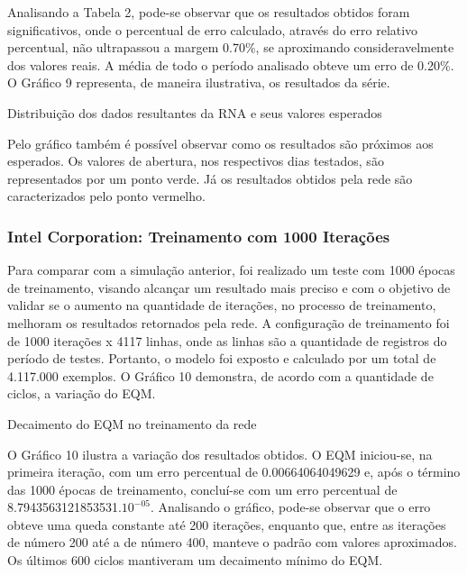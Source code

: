 Analisando a Tabela 2, pode-se observar que os resultados obtidos foram significativos, onde o percentual de erro calculado, através do erro relativo percentual, não ultrapassou a margem 0.70\%, se aproximando consideravelmente dos valores reais. A média de todo o período analisado obteve um erro de 0.20\%. O Gráfico 9 representa, de maneira ilustrativa, os resultados da série.
\begin{grafico}[h]
	\centering
	\caption{Distribuição dos dados resultantes da RNA e seus valores esperados}
	\label{lingua}
\end{grafico}

Pelo gráfico também é possível observar como os resultados são próximos aos esperados. Os valores de abertura, nos respectivos dias testados, são representados por um ponto verde. Já os resultados obtidos pela rede são caracterizados pelo ponto vermelho. 

\subsubsection{Intel Corporation: Treinamento com 1000 Iterações}	
Para comparar com a simulação anterior, foi realizado um teste com 1000 épocas de treinamento, visando alcançar um resultado mais preciso e com o objetivo de validar se o aumento na quantidade de iterações, no processo de treinamento, melhoram os resultados retornados pela rede. A configuração de treinamento foi de 1000 iterações x 4117 linhas, onde as linhas são a quantidade de registros do período de testes. Portanto, o modelo foi exposto e calculado por um total de 4.117.000 exemplos. O Gráfico 10 demonstra, de acordo com a quantidade de ciclos, a variação do EQM.
\begin{grafico}[h]
	\centering
	\caption{Decaimento do EQM no treinamento da rede}
	\label{lingua}
\end{grafico}

O Gráfico 10 ilustra a variação dos resultados obtidos. O EQM iniciou-se, na primeira iteração, com um erro percentual de 0.00664064049629 e, após o término das 1000 épocas de treinamento, concluí-se com um erro percentual de 8.7943563121853531.$10^{-05}$. Analisando o gráfico, pode-se observar que o erro obteve uma queda constante até 200 iterações, enquanto que, entre as iterações de número 200 até a de número 400, manteve o padrão com valores aproximados. Os últimos 600 ciclos mantiveram um decaimento mínimo do EQM.

